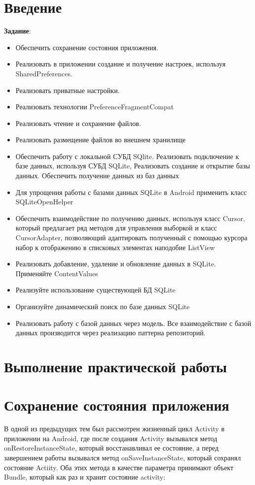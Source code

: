 
\section*{\LARGE{Введение}}

\textbf{Задание}:
\begin{itemize}
	\item Обеспечить сохранение состояния приложения.
	\item Реализовать в приложении создание и получение настроек, используя
		SharedPreferences.
	\item Реализовать приватные настройки.
	\item Реализовать технологии PreferenceFragmentCompat
	\item Реализовать чтение и сохранение файлов.
	\item Реализовать размещение файлов во внешнем хранилище
	\item Обеспечить работу с локальной СУБД SQlite. Реализовать
		подключение к базе данных, используя СУБД SQLite, Реализовать
		создание и открытие базы данных. Обеспечить получение данных из
		баз данных
	\item Для упрощения работы с базами данных SQLite в Android применить
		класс SQLiteOpenHelper
	\item Обеспечить взаимодействие по получению данных, используя класс
		Cursor, который предлагает ряд методов для управления выборкой и
		класс CursorAdapter, позволяющий адаптировать полученный с
		помощью курсора набор к отображению в списковых элементах
		наподобие ListView
	\item Реализовать добавление, удаление и обновление данных в SQLite.
		Применяйте ContentValues
	\item Реализуйте использование существующей БД SQLite
	\item Организуйте динамический поиск по базе данных SQLite
	\item Реализовать работу с базой данных через модель. Все взаимодействие
		с базой данных производится через реализацию паттерна репозиторий.
\end{itemize}

\clearpage

\section*{\LARGE{Выполнение практической работы}}
\section{Сохранение состояния приложения}
В одной из предыдущих тем был рассмотрен жизненный цикл Activity в
приложении на Android, где после создания Activity вызывался метод
onRestoreInstanceState, который восстанавливал ее состояние, а перед
завершением работы вызывался метод onSaveInstanceState, который
сохранял состояние Actiity. Оба этих метода в качестве параметра
принимают объект Bundle, который как раз и хранит состояние activity:


